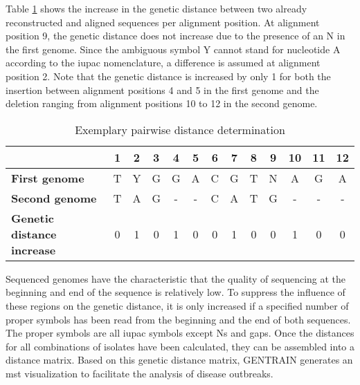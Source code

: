 Table \ref{table:exemplary_pairwise_distance_determination_result} shows the increase in the genetic distance between two already reconstructed and aligned sequences per alignment position. At alignment position 9, the genetic distance does not increase due to the presence of an N in the first genome. Since the ambiguous symbol Y cannot stand for nucleotide A according to the \acrshort{iupac} nomenclature, a difference is assumed at alignment position 2. Note that the genetic distance is increased by only 1 for both the insertion between alignment positions 4 and 5 in the first genome and the deletion ranging from alignment positions 10 to 12 in the second genome. 

\begin{table}[ht!]    
    \caption{Exemplary pairwise distance determination}
    \centering
    \begin{tabular}{ l | c c c c c c c c c c c c } 
    & \textbf{1} & \textbf{2} & \textbf{3} & \textbf{4} & \textbf{5} & \textbf{6} & \textbf{7} & \textbf{8} & \textbf{9} & \textbf{10} & \textbf{11} & \textbf{12} \\
    \hline
    \textbf{First genome} & T & Y & G & G & A & C & G & T & N & A & G & A \\
    \hline
    \textbf{Second genome} & T & A & G & - & - & C & A & T & G & - & - & - \\
     \hline
    \textbf{Genetic distance increase} & 0 & 1 & 0 & 1 & 0 & 0 & 1 & 0 & 0 & 1 & 0 & 0 \\
    \end{tabular}
    \label{table:exemplary_pairwise_distance_determination_result}
\end{table}

Sequenced genomes have the characteristic that the quality of sequencing at the beginning and end of the sequence is relatively low. To suppress the influence of these regions on the genetic distance, it is only increased if a specified number of proper symbols has been read from the beginning and the end of both sequences. The proper symbols are all \acrshort{iupac} symbols except Ns and gaps. Once the distances for all combinations of isolates have been calculated, they can be assembled into a distance matrix. Based on this genetic distance matrix, GENTRAIN generates an \acrshort{mst} visualization to facilitate the analysis of disease outbreaks.

